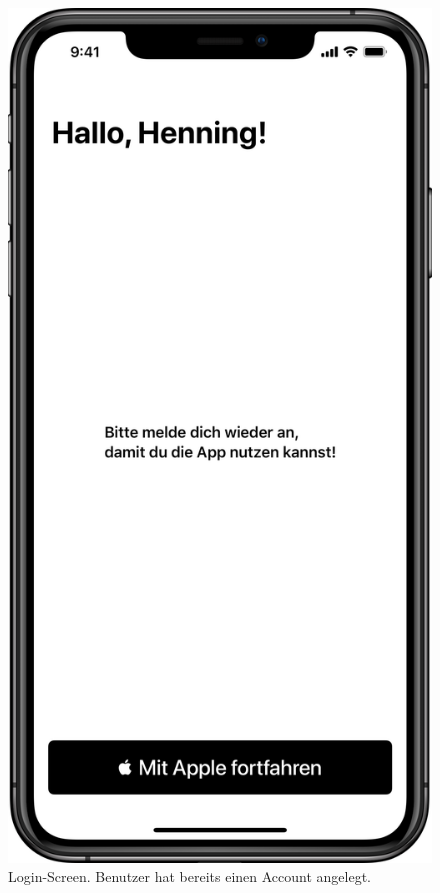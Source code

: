 \begin{minipage}{.45\textwidth}
	\begin{figure}[H]
		\centering
		\includegraphics[width=.68\textwidth]{./images/prototype/ios/loginWithAccount.png}
		\caption{\label{fig:app:ios:loginWithAccount}Login-Screen. Benutzer hat bereits einen Account angelegt.}
	\end{figure}
\end{minipage}\clearpage

